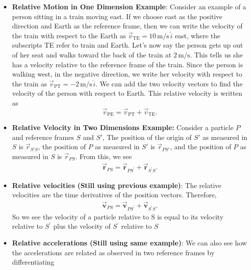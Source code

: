 \documentclass{report}
\begin{document}
\begin{itemize}
            \item \textbf{Relative Motion in One Dimension Example}:
                Consider an example of a person sitting in a train moving east. If we choose east as the positive direction and Earth as the reference frame, then we can write the velocity of the train with respect to the Earth as $\vec{v}_{\text{TE}} = 10 \, \text{m/s} \, \hat{i}$ east, where the subscripts TE refer to train and Earth. Let’s now say the person gets up out of her seat and walks toward the back of the train at $2 \, \text{m/s}$. This tells us she has a velocity relative to the reference frame of the train. Since the person is walking west, in the negative direction, we write her velocity with respect to the train as $\vec{v}_{\text{PT}} = -2 \, \text{m/s} \, \hat{i}$. We can add the two velocity vectors to find the velocity of the person with respect to Earth. This relative velocity is written as
                \[
                    \vec{v}_{\text{PE}} = \vec{v}_{\text{PT}} + \vec{v}_{\text{TE}}.
                \]
            \item \textbf{Relative Velocity in Two Dimensions Example:}
                Consider a particle \(P\) and reference frames \(S\) and \(S'\), The position of the origin of \(S'\)
                as measured in \(S\) is \(\vec{r}_{S'S}\),
                the position of \(P\) as measured in \(S'\)
                is \(\vec{r}_{PS'}\),
                and the position of \(P\) as measured in \(S\) is \(\vec{r}_{PS}\).
                \bigbreak \noindent 
                \bigbreak \noindent 
                From this, we see 
                \begin{align*}
                    \vec{\mathbf{r}}_{PS} = \vec{\mathbf{r}}_{PS^{\prime}} + \vec{\mathbf{r}}_{S^{\prime}S}
                .\end{align*}
        \item \textbf{Relative velocities (Still using previous example)}: The relative velocities are the time derivatives of the position vectors. Therefore,
            \begin{align*}
                    \vec{\mathbf{v}}_{PS} = \vec{\mathbf{v}}_{PS^{\prime}} + \vec{\mathbf{v}}_{S^{\prime}S}
            .\end{align*}
            \bigbreak \noindent 
            So we see the velocity of a particle relative to S is equal to its velocity relative to  $S^{\prime}$ plus the velocity of $S^{\prime}$ relative to $S$
        \item \textbf{Relative accelerations (Still using same example)}:  We can also see how the accelerations are related as observed in two reference frames by differentiating

\end{itemize}
\end{document}
